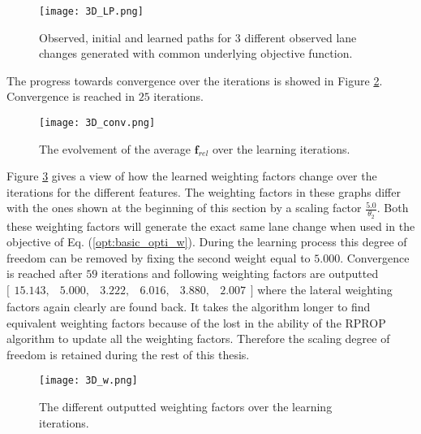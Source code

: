  \begin{figure}[h!]
	\centering
	\texttt{[image: 3D\_LP.png]}
	\caption{Observed, initial and learned paths for 3 different observed lane changes generated with common underlying objective function.}
	\label{fig:3D_learned_path}
\end{figure}
 
The progress towards convergence over the iterations is showed in Figure \ref{fig:3D_conv}. Convergence is reached in $25$ iterations.

\begin{figure}[h!]
	\centering
	\texttt{[image: 3D\_conv.png]}
	\caption{The evolvement of the average $\bm{f}_{rel}$ over the learning iterations.}
	\label{fig:3D_conv}
\end{figure}

Figure \ref{fig:3D_w} gives a view of how the learned weighting factors change over the iterations for the different features. The weighting factors in these graphs differ with the ones shown at the beginning of this section by a scaling factor $\frac{5.0}{\theta_2}$. Both these weighting factors will generate the exact same lane change when used in the objective of Eq. (\ref{opt:basic_opti_w}). During the learning process this degree of freedom can be removed by fixing the second weight equal to $5.000$. Convergence is reached after $59$ iterations and following weighting factors are outputted $\bigl[ \begin{smallmatrix} 15.143,&5.000,&3.222,&6.016,&3.880,&2.007\end{smallmatrix}\bigr]$ where the lateral weighting factors again clearly are found back. It takes the algorithm longer to find equivalent weighting factors because of the lost in the ability of the RPROP algorithm to update all the weighting factors. Therefore the scaling degree of freedom is retained during the rest of this thesis. \\

 
\begin{figure}[h!]
	\centering
	\texttt{[image: 3D\_w.png]}
	\caption{The different outputted weighting factors over the learning iterations.}
	\label{fig:3D_w}
\end{figure}

